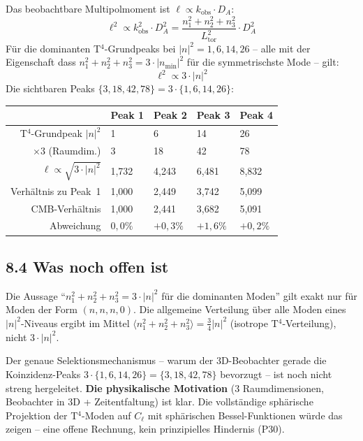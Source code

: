 Das beobachtbare Multipolmoment ist
$\ell \propto k_\mathrm{obs} \cdot D_A$:
\[
  \ell^2 \propto k_\mathrm{obs}^2 \cdot D_A^2
  = \frac{n_1^2+n_2^2+n_3^2}{L_\mathrm{tor}^2} \cdot D_A^2
\]
Für die dominanten T$^4$-Grundpeaks bei $|n|^2 = 1, 6, 14, 26$
-- alle mit der Eigenschaft dass $n_1^2+n_2^2+n_3^2 = 3\cdot|n_\mathrm{min}|^2$
für die symmetrischste Mode -- gilt:
\[
  \ell^2 \propto 3 \cdot |n|^2
\]
Die sichtbaren Peaks $\{3, 18, 42, 78\} = 3\cdot\{1, 6, 14, 26\}$:

\begin{center}
\begin{tabular}{rllll}
\toprule
 & Peak 1 & Peak 2 & Peak 3 & Peak 4 \\
\midrule
T$^4$-Grundpeak $|n|^2$ & 1 & 6 & 14 & 26 \\
$\times 3$ (Raumdim.) & 3 & 18 & 42 & 78 \\
$\ell \propto \sqrt{3\cdot|n|^2}$ & 1{,}732 & 4{,}243 & 6{,}481 & 8{,}832 \\
Verhältnis zu Peak~1 & 1{,}000 & 2{,}449 & 3{,}742 & 5{,}099 \\
CMB-Verhältnis & 1{,}000 & 2{,}441 & 3{,}682 & 5{,}091 \\
Abweichung & $0{,}0\%$ & $+0{,}3\%$ & $+1{,}6\%$ & $+0{,}2\%$ \\
\bottomrule
\end{tabular}
\end{center}

\subsection*{8.4 Was noch offen ist}

Die Aussage ``$n_1^2+n_2^2+n_3^2 = 3\cdot|n|^2$ für die dominanten
Moden'' gilt exakt nur für Moden der Form $(n,n,n,0)$.
Die allgemeine Verteilung über alle Moden eines $|n|^2$-Niveaus
ergibt im Mittel $\langle n_1^2+n_2^2+n_3^2\rangle = \tfrac{3}{4}|n|^2$
(isotrope T$^4$-Verteilung), nicht $3\cdot|n|^2$.

Der genaue Selektionsmechanismus -- warum der 3D-Beobachter
gerade die Koinzidenz-Peaks $3\cdot\{1,6,14,26\}=\{3,18,42,78\}$
bevorzugt -- ist noch nicht streng hergeleitet.
\textbf{Die physikalische Motivation} (3 Raumdimensionen,
Beobachter in 3D + Zeitentfaltung) ist klar.
Die vollständige sphärische Projektion der T$^4$-Moden auf $C_\ell$
mit sphärischen Bessel-Funktionen würde das zeigen --
eine offene Rechnung, kein prinzipielles Hindernis (P30).


